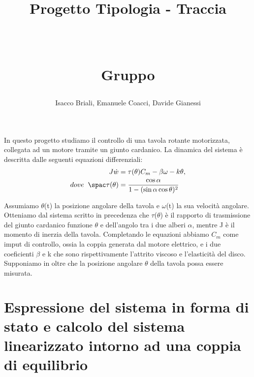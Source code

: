 \documentclass[a4paper, 11pt]{article}
\title{ \vspace{-1in}
		\huge \strut \coursename \strut 
		\\
		\Large  \strut Progetto Tipologia \tipology - Traccia \trace 
		\\
		\Large  \strut \projectname\strut
		\\
		\Large  \strut Gruppo \group\strut
		\vspace{-0.4cm}
}
\author{ Isacco Briali, Emanuele Coacci, Davide Gianessi}
\date{}
\begin{document}
\maketitle
\vspace{-0.5cm}
In questo progetto studiamo il controllo di una tavola rotante motorizzata, collegata ad un motore tramite un giunto cardanico. La dinamica del sistema è descritta dalle seguenti equazioni differenziali:
%
\begin{subequations}\label{eq:system}
\begin{align}
	    J\dot{w} &= \tau(\theta)C_m - \beta\omega - k\theta,
        \\
        dove \hspace{0,2cm} \spac \tau(\theta) &= \frac{\cos{\alpha}}{1-(\sin{\alpha\cos{\theta)^2}}}
\end{align}
\end{subequations}
%

Assumiamo $\theta$(t) la posizione angolare della tavola e $\omega$(t) la sua velocità angolare. Otteniamo dal sistema scritto in precedenza che $\tau$($\theta$) è il rapporto di trasmissione del giunto cardanico funzione $\theta$ e dell'angolo tra i due alberi $\alpha$, mentre J è il momento di inerzia della tavola. Completando le equazioni abbiamo $C_m$ come imput di controllo, ossia la coppia generata dal motore elettrico, e i due coeficienti $\beta$ e k che sono rispettivamente l'attrito viscoso e l'elasticità del disco. Supponiamo in oltre che la posizione angolare $\theta$ della tavola possa essere misurata.



\section{Espressione del sistema in forma di stato e calcolo del sistema linearizzato intorno ad una coppia di equilibrio}
\end{document}
